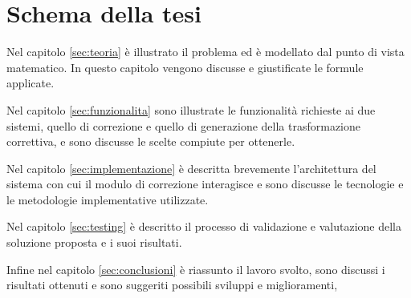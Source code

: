 
\section{Schema della tesi}

Nel capitolo \ref{sec:teoria} è illustrato il problema ed è modellato dal punto di vista matematico. In questo capitolo vengono discusse e giustificate le formule applicate.

Nel capitolo \ref{sec:funzionalita} sono illustrate le funzionalità richieste ai due sistemi, quello di correzione e quello di generazione della trasformazione correttiva, e sono discusse le scelte compiute per ottenerle.

Nel capitolo \ref{sec:implementazione} è descritta brevemente l'architettura del sistema con cui il modulo di correzione interagisce e sono discusse le tecnologie e le metodologie implementative utilizzate.

Nel capitolo \ref{sec:testing} è descritto il processo di validazione e valutazione della soluzione proposta e i suoi risultati.

Infine nel capitolo \ref{sec:conclusioni} è riassunto il lavoro svolto, sono discussi i risultati ottenuti e sono suggeriti possibili sviluppi e miglioramenti,




